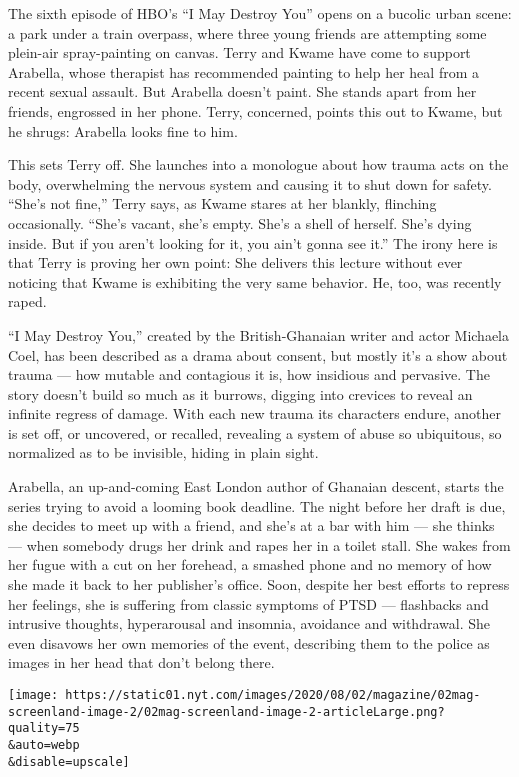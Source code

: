 The sixth episode of HBO's ``I May Destroy You'' opens on a bucolic
urban scene: a park under a train overpass, where three young friends
are attempting some plein-air spray-painting on canvas. Terry and Kwame
have come to support Arabella, whose therapist has recommended painting
to help her heal from a recent sexual assault. But Arabella doesn't
paint. She stands apart from her friends, engrossed in her phone. Terry,
concerned, points this out to Kwame, but he shrugs: Arabella looks fine
to him.

This sets Terry off. She launches into a monologue about how trauma acts
on the body, overwhelming the nervous system and causing it to shut down
for safety. ``She's not fine,'' Terry says, as Kwame stares at her
blankly, flinching occasionally. ``She's vacant, she's empty. She's a
shell of herself. She's dying inside. But if you aren't looking for it,
you ain't gonna see it.'' The irony here is that Terry is proving her
own point: She delivers this lecture without ever noticing that Kwame is
exhibiting the very same behavior. He, too, was recently raped.

``I May Destroy You,'' created by the British-Ghanaian writer and actor
Michaela Coel, has been described as a drama about consent, but mostly
it's a show about trauma --- how mutable and contagious it is, how
insidious and pervasive. The story doesn't build so much as it burrows,
digging into crevices to reveal an infinite regress of damage. With each
new trauma its characters endure, another is set off, or uncovered, or
recalled, revealing a system of abuse so ubiquitous, so normalized as to
be invisible, hiding in plain sight.

Arabella, an up-and-coming East London author of Ghanaian descent,
starts the series trying to avoid a looming book deadline. The night
before her draft is due, she decides to meet up with a friend, and she's
at a bar with him --- she thinks --- when somebody drugs her drink and
rapes her in a toilet stall. She wakes from her fugue with a cut on her
forehead, a smashed phone and no memory of how she made it back to her
publisher's office. Soon, despite her best efforts to repress her
feelings, she is suffering from classic symptoms of PTSD --- flashbacks
and intrusive thoughts, hyperarousal and insomnia, avoidance and
withdrawal. She even disavows her own memories of the event, describing
them to the police as images in her head that don't belong there.

\texttt{[image: https://static01.nyt.com/images/2020/08/02/magazine/02mag-screenland-image-2/02mag-screenland-image-2-articleLarge.png?quality=75\\\&auto=webp\\\&disable=upscale]}


